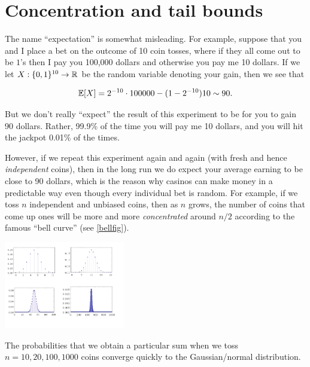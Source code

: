 
\section{Concentration and tail
bounds}\label{Concentration-and-tail-bounds}

The name ``expectation'' is somewhat misleading. For example, suppose
that you and I place a bet on the outcome of 10 coin tosses, where if
they all come out to be \(1\)'s then I pay you 100,000 dollars and
otherwise you pay me 10 dollars. If we let
\(X:\{0,1\}^{10} \rightarrow {\mathbb{R}}\) be the random variable denoting your
gain, then we see that

\[
\operatorname*{\mathbb E}[X] = 2^{-10}\cdot 100000 - (1-2^{-10})10 \sim 90 .
\]

But we don't really ``expect'' the result of this experiment to be for
you to gain 90 dollars. Rather, 99.9\% of the time you will pay me 10
dollars, and you will hit the jackpot 0.01\% of the times.

However, if we repeat this experiment again and again (with fresh and
hence \emph{independent} coins), then in the long run we do expect your
average earning to be close to 90 dollars, which is the reason why
casinos can make money in a predictable way even though every individual
bet is random. For example, if we toss \(n\) independent and unbiased
coins, then as \(n\) grows, the number of coins that come up ones will
be more and more \emph{concentrated} around \(n/2\) according to the
famous ``bell curve'' (see \cref{bellfig}).

\begin{marginfigure}
\centering
\includegraphics[width=\linewidth, height=1.5in, keepaspectratio]{../figure/binomial.png}
\caption{The probabilities that we obtain a particular sum when we toss
\(n=10,20,100,1000\) coins converge quickly to the Gaussian/normal
distribution.}
\label{bellfig}
\end{marginfigure}

